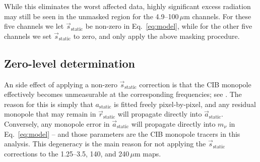 \documentclass{aa}
\newcommand{\s}[0]{\vec{s}}
\renewcommand{\a}[0]{\vec{a}}
\renewcommand{\r}[0]{\vec{r}}
\begin{document}
%


While this eliminates the worst affected data, highly significant
excess radiation may still be seen in the unmasked region for the
4.9--100$\,\mu$m channels. For these five channels we let
$\s_{\mathrm{static}}$ be non-zero in Eq.~\eqref{eq:model}, while
for the other five channels we set $\s_{\mathrm{static}}$ to zero, and
only apply the above masking procedure.

\subsection{Zero-level determination}

An side effect of applying a non-zero
$\s_{\mathrm{static}}$ correction is that the CIB monopole effectively
becomes unmeasurable at the corresponding frequencies; see
\citet{CG02_03}. The reason for this is simply that
$a_{\mathrm{static}}$ is fitted freely pixel-by-pixel, and any
residual monopole that may remain in $\r_{\mathrm{static}}$ will
propagate directly into $\a_{\mathrm{static}}$. Conversely, any
monopole error in $\a_{\mathrm{static}}$ will propagate directly into
$m_{\nu}$ in Eq.~\eqref{eq:model} -- and those parameters are the CIB
monopole tracers in this analysis. This degeneracy is the main reason
for not applying the $\s_{\mathrm{static}}$ corrections to the
1.25--3.5, 140, and 240$\,\mu$m maps.
\end{document}
